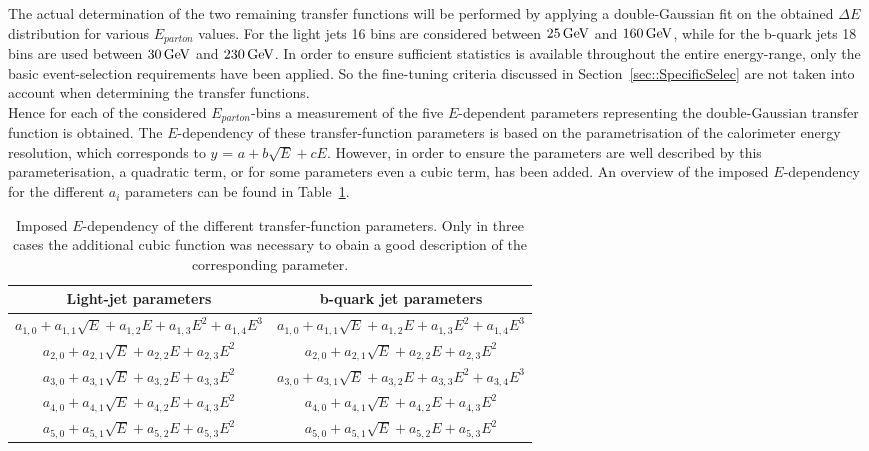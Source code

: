 The actual determination of the two remaining transfer functions will be performed by applying a double-Gaussian fit on the obtained $\Delta E$ distribution for various $E_{parton}$ values.
For the light jets 16 bins are considered between $25 \, \mathrm{GeV}$ and $160 \, \mathrm{GeV}$, while for the b-quark jets 18 bins are used between $30 \, \mathrm{GeV}$ and $230 \, \mathrm{GeV}$.
In order to ensure sufficient statistics is available throughout the entire energy-range, only the basic event-selection requirements have been applied. So the fine-tuning criteria discussed in Section~\ref{sec::SpecificSelec} are not taken into account when determining the transfer functions.
\\
Hence for each of the considered $E_{parton}$-bins a measurement of the five $E$-dependent parameters representing the double-Gaussian transfer function is obtained.
The $E$-dependency of these transfer-function parameters is based on the parametrisation of the calorimeter energy resolution, which corresponds to $y$ = $a + b \sqrt{E} + c E$.
However, in order to ensure the parameters are well described by this parameterisation, a quadratic term, or for some parameters even a cubic term, has been added. An overview of the imposed $E$-dependency for the different $a_i$ parameters can be found in Table~\ref{table::EDependency}.
\\
\begin{table}[h!tp]
 \centering
 \caption{Imposed $E$-dependency of the different transfer-function parameters. Only in three cases the additional cubic function was necessary to obain a good description of the corresponding parameter.} \label{table::EDependency}
 \renewcommand{\arraystretch}{1.2}
 \begin{tabular}{|c|c|}
  \hline
  Light-jet parameters 								& b-quark jet parameters 							\\
  \hline
  $a_{1,0} + a_{1,1}\sqrt{E} + a_{1,2} E + a_{1,3} E^{2} + a_{1,4} E^{3}$ 	& $a_{1,0} + a_{1,1}\sqrt{E} + a_{1,2} E + a_{1,3} E^{2} + a_{1,4} E^{3}$ 	\\
  $a_{2,0} + a_{2,1}\sqrt{E} + a_{2,2} E + a_{2,3} E^{2}$ 			& $a_{2,0} + a_{2,1}\sqrt{E} + a_{2,2} E + a_{2,3} E^{2}$		 	\\
  $a_{3,0} + a_{3,1}\sqrt{E} + a_{3,2} E + a_{3,3} E^{2}$		 	& $a_{3,0} + a_{3,1}\sqrt{E} + a_{3,2} E + a_{3,3} E^{2} + a_{3,4} E^{3}$ 	\\
  $a_{4,0} + a_{4,1}\sqrt{E} + a_{4,2} E + a_{4,3} E^{2}$		 	& $a_{4,0} + a_{4,1}\sqrt{E} + a_{4,2} E + a_{4,3} E^{2}$		 	\\
  $a_{5,0} + a_{5,1}\sqrt{E} + a_{5,2} E + a_{5,3} E^{2}$		 	& $a_{5,0} + a_{5,1}\sqrt{E} + a_{5,2} E + a_{5,3} E^{2}$ 			\\
  \hline
 \end{tabular}
\end{table}

